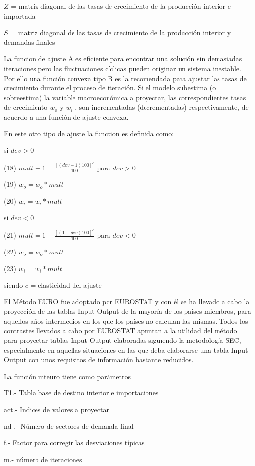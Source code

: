 \documentclass{article}
\begin{document}
$Z$ = matriz diagonal de las tasas de crecimiento de la producción interior e importada

$S$ = matriz diagonal de  las tasas de crecimiento de la producción interior y demandas finales

La funcion de ajuste A es eficiente para encontrar una solución sin demasiadas iteraciones pero las fluctuaciones cíclicas pueden originar un sistema inestable. Por ello una función convexa tipo B es la recomendada para ajustar las tasas de crecimiento durante el proceso de iteración. Si el modelo subestima (o sobreestima) la variable macroeconómica a proyectar, las correspondientes tasas de crecimiento $w_o$ y $w_i$ , son incrementadas (decrementadas) respectivamente, de acuerdo a una función de ajuste convexa.

En este otro tipo de ajuste la function es definida como:

si $dev > 0$

(18) $mult = 1 + \frac {[(dev-1)100]^c}{100}$ para $dev > 0$

(19) $w_o = w_o*mult$

(20) $w_i = w_i*mult$

si $dev < 0$

(21) $mult = 1 - \frac {[(1-dev)100]^c}{100}$ para $dev < 0$

(22) $w_o = w_o*mult$

(23) $w_i = w_i*mult$

siendo $c$ = elasticidad del ajuste

El Método EURO fue adoptado por EUROSTAT y con él se ha llevado a cabo la proyección de las tablas Input-Output de la mayoría de los países miembros, para aquellos años intermedios en los que los países no calculan las mismas. Todos los contrastes llevados a cabo por EUROSTAT apuntan a la utilidad del método para proyectar tablas Input-Output elaboradas siguiendo la metodología SEC, especialmente en aquellas situaciones en las que deba elaborarse una tabla Input-Output con unos requisitos de información bastante reducidos.

La función mteuro tiene como parámetros

T1.- Tabla base de destino interior e importaciones

act.- Indices de valores a proyectar

nd .- Número de sectores de demanda final

f.- Factor para corregir las desviaciones típicas

m.- número de iteraciones
\end{document}

